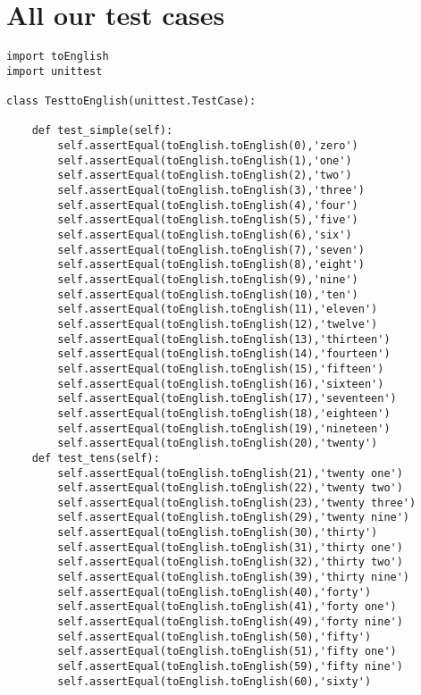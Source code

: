 \documentclass{paper}
\begin{document}
\section{All our test cases}
\begin{lstlisting}
import toEnglish
import unittest

class TesttoEnglish(unittest.TestCase):

    def test_simple(self):
        self.assertEqual(toEnglish.toEnglish(0),'zero')
        self.assertEqual(toEnglish.toEnglish(1),'one')
        self.assertEqual(toEnglish.toEnglish(2),'two')
        self.assertEqual(toEnglish.toEnglish(3),'three')
        self.assertEqual(toEnglish.toEnglish(4),'four')
        self.assertEqual(toEnglish.toEnglish(5),'five')
        self.assertEqual(toEnglish.toEnglish(6),'six')
        self.assertEqual(toEnglish.toEnglish(7),'seven')
        self.assertEqual(toEnglish.toEnglish(8),'eight')
        self.assertEqual(toEnglish.toEnglish(9),'nine')
        self.assertEqual(toEnglish.toEnglish(10),'ten')
        self.assertEqual(toEnglish.toEnglish(11),'eleven')
        self.assertEqual(toEnglish.toEnglish(12),'twelve')
        self.assertEqual(toEnglish.toEnglish(13),'thirteen')
        self.assertEqual(toEnglish.toEnglish(14),'fourteen')
        self.assertEqual(toEnglish.toEnglish(15),'fifteen')
        self.assertEqual(toEnglish.toEnglish(16),'sixteen')
        self.assertEqual(toEnglish.toEnglish(17),'seventeen')
        self.assertEqual(toEnglish.toEnglish(18),'eighteen')
        self.assertEqual(toEnglish.toEnglish(19),'nineteen')
        self.assertEqual(toEnglish.toEnglish(20),'twenty')
    def test_tens(self):
        self.assertEqual(toEnglish.toEnglish(21),'twenty one')
        self.assertEqual(toEnglish.toEnglish(22),'twenty two')
        self.assertEqual(toEnglish.toEnglish(23),'twenty three')
        self.assertEqual(toEnglish.toEnglish(29),'twenty nine')
        self.assertEqual(toEnglish.toEnglish(30),'thirty')
        self.assertEqual(toEnglish.toEnglish(31),'thirty one')
        self.assertEqual(toEnglish.toEnglish(32),'thirty two')
        self.assertEqual(toEnglish.toEnglish(39),'thirty nine')
        self.assertEqual(toEnglish.toEnglish(40),'forty')
        self.assertEqual(toEnglish.toEnglish(41),'forty one')
        self.assertEqual(toEnglish.toEnglish(49),'forty nine')
        self.assertEqual(toEnglish.toEnglish(50),'fifty')
        self.assertEqual(toEnglish.toEnglish(51),'fifty one')
        self.assertEqual(toEnglish.toEnglish(59),'fifty nine')
        self.assertEqual(toEnglish.toEnglish(60),'sixty')

\end{lstlisting}
\end{document}
